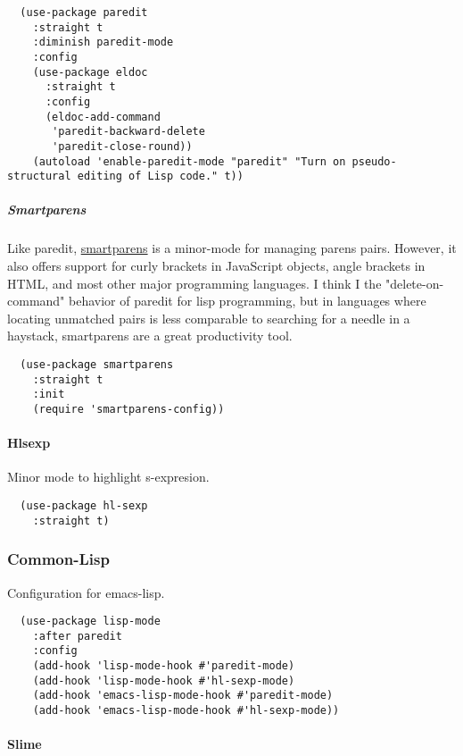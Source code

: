 \documentclass[11pt]{article}
\begin{document}
\begin{verbatim}
  (use-package paredit
    :straight t
    :diminish paredit-mode
    :config
    (use-package eldoc
      :straight t
      :config
      (eldoc-add-command
       'paredit-backward-delete
       'paredit-close-round))
    (autoload 'enable-paredit-mode "paredit" "Turn on pseudo-structural editing of Lisp code." t))
\end{verbatim}

\subparagraph*{Smartparens}
\label{sec:orgc8c55c7}

Like paredit, \href{https://github.com/Fuco1/smartparens}{smartparens} is a minor-mode for managing parens
pairs. However, it also offers support for curly brackets in
JavaScript objects, angle brackets in HTML, and most other major
programming languages. I think I the "delete-on-command" behavior of
paredit for lisp programming, but in languages where locating
unmatched pairs is less comparable to searching for a needle in a
haystack, smartparens are a great productivity tool.

\begin{verbatim}
  (use-package smartparens
    :straight t
    :init
    (require 'smartparens-config))
\end{verbatim}

\paragraph*{Hlsexp}
\label{sec:org654795a}

Minor mode to highlight s-expresion.

\begin{verbatim}
  (use-package hl-sexp
    :straight t)
\end{verbatim}

\subsubsection*{Common-Lisp}
\label{sec:org79e9913}

Configuration for emacs-lisp.

\begin{verbatim}
  (use-package lisp-mode
    :after paredit
    :config
    (add-hook 'lisp-mode-hook #'paredit-mode)
    (add-hook 'lisp-mode-hook #'hl-sexp-mode)
    (add-hook 'emacs-lisp-mode-hook #'paredit-mode)
    (add-hook 'emacs-lisp-mode-hook #'hl-sexp-mode))
\end{verbatim}

\paragraph*{Slime}
\label{sec:orga51e41e}
\end{document}
